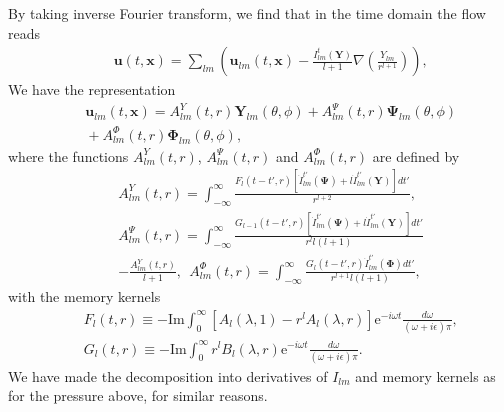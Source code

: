 \documentclass[aps,prx,twocolumn,amsmath,amssymb,amsfonts]{revtex4-2}
\newcommand{\rIm}{\mathrm{Im}}
\newcommand{\re}{\mathrm{e}}            %
\begin{document}
By taking inverse Fourier transform, we find that in the time domain the flow reads
\begin{eqnarray}&&\!\!\!\!\!\!
\bm u(t, \bm x) \!= \!\sum_{lm}\left(\bm u_{lm}(t, \bm x)-\frac{I^{t}_{lm}(\bm Y)}{l+1}\nabla \left(\frac{Y_{lm}}{r^{l+1}}\right)\right),\label{ug}
\end{eqnarray}
We have the representation
\begin{eqnarray}&&\!\!\!\!\!\!
\bm u_{lm}(t, \bm x) \!=\! A_{lm}^{Y}(t, r)\bm Y_{lm}(\theta, \phi)\!+\!A_{lm}^{\Psi}(t, r)\bm \Psi_{lm}(\theta, \phi) \nonumber\\&&\!\!\!\!\!\!
 +A_{lm}^{\Phi}(t, r)\bm \Phi_{lm}(\theta, \phi),\label{ugent}
\end{eqnarray}
where the functions $A_{lm}^{Y}(t, r)$, $A_{lm}^{\Psi}(t, r)$ and $A_{lm}^{\Phi}(t, r)$ are defined by
\begin{eqnarray}&&
A_{lm}^{Y}(t, r)\! = \!\int_{-\infty}^{\infty}\! \frac{F_l(t\!-\!t', r) [ \dot{I}_{lm}^{t'}(\bm \Psi) \!+\! l \dot{I}_{lm}^{t'}(\bm Y)] dt'}{r^{l+2}},\label{APhit}
\\&&
A_{lm}^{\Psi}(t, r)\!=\! \int_{-\infty}^{\infty} \!\frac{G_{l-1}(t\!-\!t', r) [ \dot{I}_{lm}^{t'}(\bm \Psi) \!+\! l \dot{I}_{lm}^{t'}(\bm Y)] dt'}{r^{l}l(l+1)}
\nonumber\\&&
-\frac{A_{lm}^{Y}(t, r)}{l+1},\ \
A_{lm}^{\Phi}(t, r)\! =\!\int_{-\infty}^{\infty} \!\frac{G_l(t\!-\!t', r) \dot{I}_{lm}^{t'}(\bm \Phi)dt'}{r^{l+1}l(l+1)},\nonumber
\end{eqnarray}
with the memory kernels
\begin{eqnarray}&&
F_l(t, r)\equiv -\rIm \int_{0}^{\infty} [A_{l}(\lambda, 1)\!-\!r^l A_{l}(\lambda, r)] \re^{-i \omega t}\frac{d\omega}{(\omega\!+\!i\epsilon) \pi},\nonumber\\&&
G_l(t, r)\equiv  -\rIm  \int_{0}^{\infty}r^l B_l(\lambda, r)\re^{-i \omega t}\frac{d\omega}{(\omega+i\epsilon) \pi}. \label{ut}
\end{eqnarray}
We have made the decomposition into derivatives of $I_{lm}$ and memory kernels as for the pressure above, for similar reasons.
\end{document}
